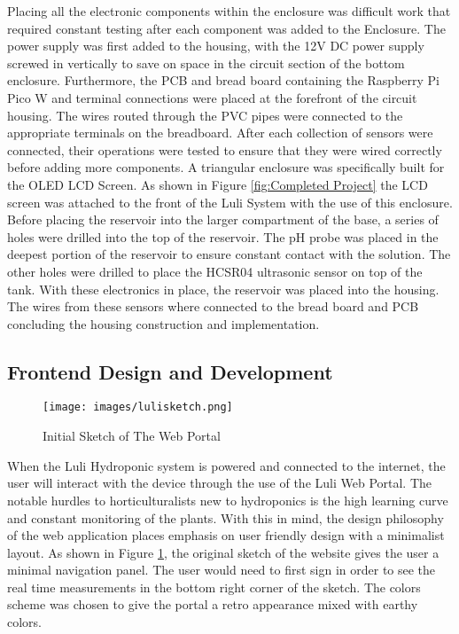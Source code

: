 \documentclass[12pt]{article} %
\begin{document}
\noindent Placing all the electronic components within the enclosure was difficult work that required constant testing after each component was added to the Enclosure. The power supply was first added to the housing, with the 12V DC power supply screwed in vertically to save on space in the circuit section of the bottom enclosure. Furthermore, the PCB and bread board containing the Raspberry Pi Pico W and terminal connections were placed at the forefront of the circuit housing. The wires routed through the PVC pipes were connected to the appropriate terminals on the breadboard. After each collection of sensors were connected, their operations were tested to ensure that they were wired correctly before adding more components. A triangular enclosure was specifically built for the OLED LCD Screen. As shown in Figure \ref{fig:Completed Project} the LCD screen was attached to the front of the Luli System with the use of this enclosure. Before placing the reservoir into the larger compartment of the base, a series of holes were drilled into the top of the reservoir. The pH probe was placed in the deepest portion of the reservoir to ensure constant contact with the solution. The other holes were drilled to place the HCSR04 ultrasonic sensor on top of the tank. With these electronics in place, the reservoir was placed into the housing. The wires from these sensors where connected to the bread board and PCB concluding the housing construction and implementation. 


\subsection{Frontend Design and Development}
\begin{figure}[H]
    \centering
    \texttt{[image: images/lulisketch.png]}
    \caption{Initial Sketch of The Web Portal}
    \label{fig: Portal Sketch}
  \end{figure}
  
  \pagebreak
  
  When the Luli Hydroponic system is powered and connected to the internet, the user will interact with the device through the use of the Luli Web Portal. The notable hurdles to horticulturalists new to hydroponics is the high learning curve and constant monitoring of the plants. With this in mind, the design philosophy of the web application places emphasis on user friendly design with a minimalist layout. As shown in Figure \ref{fig: Portal Sketch}, the original sketch of the website gives the user a minimal navigation panel. The user would need to first sign in order to see the real time measurements in the bottom right corner of the sketch. The colors scheme was chosen to give the portal a retro appearance mixed with earthy colors.
  
\end{document}
